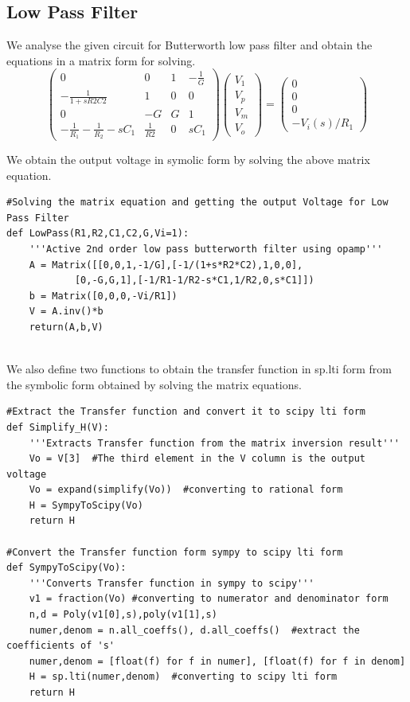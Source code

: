 \documentclass[11pt, a4paper]{article}
\begin{document}
\subsection{Low Pass Filter}
{
We analyse the given circuit for Butterworth low pass filter and obtain the equations in a matrix form for solving.
}
\[\begin{pmatrix} 0 & 0 & 1 & -\frac{1}{G} 
\\ -\frac{1}{1+sR2C2} & 1 & 0 & 0 
\\ 0 & -G & G & 1 
\\ -\frac{1}{R_1}-\frac{1}{R_2}-sC_1 & \frac{1}{R2} & 0 & sC_1 
\end{pmatrix}
\begin{pmatrix} V_1 \\ V_p \\ V_m \\ V_o \end{pmatrix}
 = 
\begin{pmatrix} 0 \\ 0 \\ 0 \\ -V_i(s)/R_1 \end{pmatrix}\]

We obtain the output voltage in symolic form by solving the above matrix equation.
\begin{verbatim}
#Solving the matrix equation and getting the output Voltage for Low Pass Filter
def LowPass(R1,R2,C1,C2,G,Vi=1):
    '''Active 2nd order low pass butterworth filter using opamp''' 
    A = Matrix([[0,0,1,-1/G],[-1/(1+s*R2*C2),1,0,0],
    		[0,-G,G,1],[-1/R1-1/R2-s*C1,1/R2,0,s*C1]])
    b = Matrix([0,0,0,-Vi/R1])
    V = A.inv()*b
    return(A,b,V)
    
\end{verbatim}

We also define two functions to obtain the transfer function in sp.lti form from the symbolic form obtained by solving the matrix equations.
\begin{verbatim}
#Extract the Transfer function and convert it to scipy lti form
def Simplify_H(V):
    '''Extracts Transfer function from the matrix inversion result'''
    Vo = V[3]  #The third element in the V column is the output voltage
    Vo = expand(simplify(Vo))  #converting to rational form
    H = SympyToScipy(Vo)
    return H

#Convert the Transfer function form sympy to scipy lti form
def SympyToScipy(Vo):
    '''Converts Transfer function in sympy to scipy'''
    v1 = fraction(Vo) #converting to numerator and denominator form
    n,d = Poly(v1[0],s),poly(v1[1],s)
    numer,denom = n.all_coeffs(), d.all_coeffs()  #extract the coefficients of 's'
    numer,denom = [float(f) for f in numer], [float(f) for f in denom]
    H = sp.lti(numer,denom)  #converting to scipy lti form
    return H
    
\end{verbatim}
\end{document}
